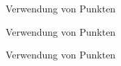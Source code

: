 

\bigskip

Verwendung von Punkten



\medskip



\bigskip
Verwendung von Punkten



\medskip



\bigskip
Verwendung von Punkten



\medskip



